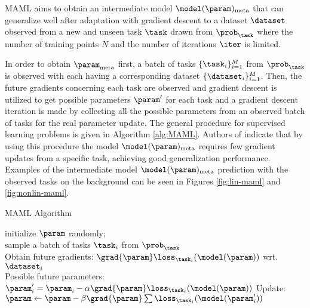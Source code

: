 MAML aims to obtain an intermediate model $\model({\param})_{\text{meta}}$ that can generalize well after adaptation with gradient descent to a dataset $\dataset$ observed from a new and unseen task $\task$ drawn from $\prob_\task$ where the number of training points $N$ and the number of iterations $\iter$ is limited.  

In order to obtain $\param_{\text{meta}}$ first, a batch of tasks $\{\task_i\}_{i=1}^{M}$ from $\prob_{\task}$ is observed with each having a corresponding dataset $\{\dataset_i\}_{i=1}^{M}$. Then, the future gradients concerning each task are observed and gradient descent is utilized to get possible parameters $\param^\prime$ for each task and a gradient descent iteration is made by collecting all the possible parameters from an observed batch of tasks for the real parameter update. The general procedure for supervised learning problems is given in Algorithm \ref{alg:MAML}. Authors of \cite{finn2017} indicate that by using this procedure the model $\model({\param})_{\text{meta}}$ requires few gradient updates from a specific task, achieving good generalization performance. Examples of the intermediate model $\model({\param})_{\text{meta}}$ prediction with the observed tasks on the background can be seen in Figures \ref{fig:lin-maml} and \ref{fig:nonlin-maml}.

\begin{algorithm}
  \caption{MAML\cite{finn2017} Algorithm}\label{alg:MAML}
  \KwData{$\prob_{\task}$, $\alpha$, $\beta$}
  initialize $\param$ randomly; \\
  {
    sample a batch of tasks $\task_i$ from $\prob_{\task}$\\
    {
      Obtain future gradients: $\grad{\param}\loss_{\task_i}(\model(\param))$ wrt. $\dataset_i$ \\
      Possible future parameters: $\param_i^\prime = \param_i -\alpha\grad{\param}\loss_{\task_i}(\model(\param))$
    }
    Update: $\param \leftarrow \param- \beta\grad{\param}\sum\loss_{\task_i}(\model(\param_i^\prime))$
  }
\end{algorithm}


